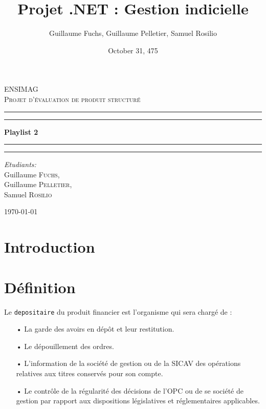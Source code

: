\documentclass[french,12pt,a4paper]{article}
\title{Projet .NET : Gestion indicielle}
\date{October 31, 475}
\author{Guillaume Fuchs, Guillaume Pelletier, Samuel Rosilio}
\begin{document}
\begin{titlepage}
\begin{center}

\textsc{\LARGE ENSIMAG}\\[1.5cm]

\textsc{\Large Projet d'évaluation de produit structuré}\\[0.5cm]

 \hrule
 \hrule 
 
\vspace{7mm}
{ \huge \bfseries Playlist 2  }

\vspace{7mm}
\hrule
\hrule

\vspace{7mm}
\begin{minipage}{0.4\textwidth}
\begin{flushleft} \large
\emph{Etudiants:}\\
Guillaume \textsc{Fuchs},\\
Guillaume \textsc{Pelletier},\\
Samuel \textsc{Rosilio}
\end{flushleft}
\end{minipage}

\vfill

{\large \today}

\end{center}
\end{titlepage}
\tableofcontents
\newpage

\section{Introduction}



\section{Définition}

Le \lstinline!depositaire! du produit financier est l'organisme qui sera chargé de :\\
\begin{itemize}
\item[•]
	La garde des avoirs en dépôt et leur restitution.
\item[•]
	Le dépouillement des ordres.
\item[•]
	L'information de la société de gestion ou de la SICAV des opérations relatives aux titres conservés pour son compte.
\item[•]
	Le contrôle de la régularité des décisions de l'OPC ou de se société de gestion par rapport aux dispositions législatives et réglementaires applicables.\\
\end{itemize}
\end{document}
